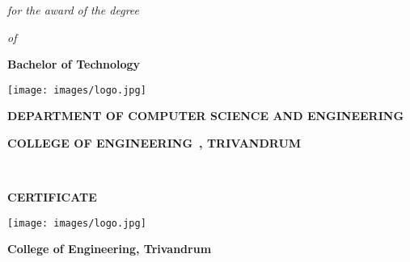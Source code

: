 \maketitle
\begin{center}
 {\it\large for the award of the degree}
\end{center}
\begin{center}
 {\it\large of}
\end{center}
\begin{center}
 {\bf\Large Bachelor of Technology}
\end{center}

\begin{center}
\texttt{[image: images/logo.jpg]}
\end{center}
\vspace{.28cm}

\begin{center}
{\bf\large DEPARTMENT OF COMPUTER SCIENCE AND ENGINEERING}

\vspace{.35cm}
{\bf\large COLLEGE OF ENGINEERING\ , TRIVANDRUM}
\begin{center}{\large {}}\\[1cm]\end{center}
\end{center}

\newpage

\begin{center}
{\bf{\LARGE CERTIFICATE}}
\end{center}
\vspace{.1cm}
\begin{center}
\texttt{[image: images/logo.jpg]}
\end{center}
\begin{center}
\textbf{\Large College of Engineering,
Trivandrum}
\end{center}

